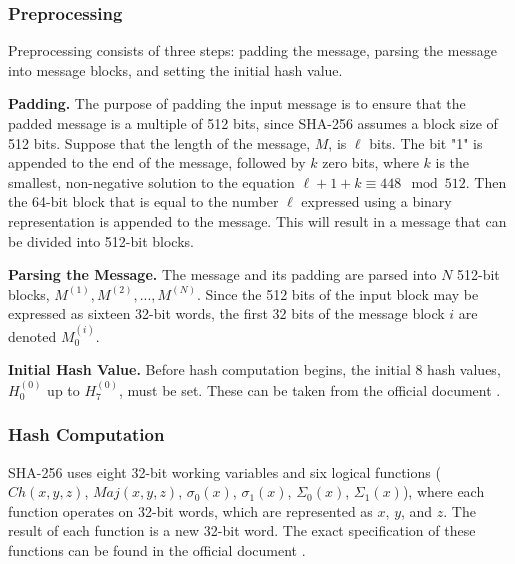 \documentclass[letterpaper]{article}
\newcommand{\mypar}[1]{{\bf #1.}}
\begin{document}
\subsubsection{Preprocessing}
Preprocessing  consists  of  three  steps:  padding  the  message,  parsing  the  message into message blocks, and setting the initial hash value. 

\mypar{Padding} The  purpose of  padding  the input message is  to  ensure  that  the  padded  message  is  a  multiple  of  512 bits, since SHA-256 assumes a block size of 512 bits. Suppose  that  the  length  of  the  message, $M$,  is $\ell$ bits.  The bit "1" is appended to the end of the message, followed by $k$ zero bits, where $k$ is the smallest, non-negative solution to the equation $\ell +1+k \equiv 448 \mod 512$.  Then  the  64-bit  block  that  is  equal  to  the  number $\ell$ expressed using  a  binary  representation is appended to the message. This will result in a message that can be divided into 512-bit blocks.

\mypar{Parsing the Message} The  message  and  its  padding  are  parsed  into $N$ 512-bit blocks, $M^{(1)}, M^{(2)},..., M^{(N)}$.  Since the 512 bits of the input block may be expressed as sixteen 32-bit words, the first 32 bits of the message block $i$ are denoted $M^{(i)}_0$.

\mypar{Initial Hash Value}
Before  hash  computation  begins,  the  initial 8  hash  values, $H^{(0)}_0$ up to $H^{(0)}_7$, must be set. These can be taken from the official document \cite{sha}.

\subsubsection{Hash Computation}\label{sha256-comp}
SHA-256 uses eight  32-bit working variables and  six  logical  functions ($Ch(x,y,z)$,  $Maj(x,y,z)$, $\sigma_0(x)$, $\sigma_1(x)$, $\Sigma_0(x)$, $\Sigma_1(x)$),  where each  function  operates  on  32-bit words, which are represented as $x$, $y$, and $z$. The result of each function is a new 32-bit word. The exact specification of these functions can be found in the official document \cite{sha}. 
\end{document}
